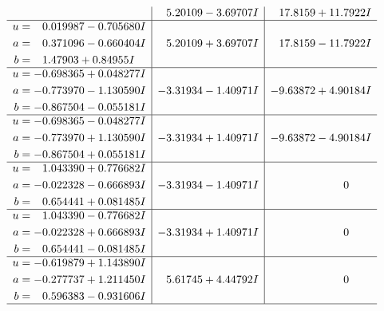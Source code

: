 \documentclass[1p]{elsarticle_modified}
\theoremstyle{definition}
\begin{document}
$$\begin{array}{c|c|c}
 & \phantom{-}5.20109 - 3.69707 I & \phantom{-}17.8159 + 11.7922 I \\ \hline\begin{aligned}
u &= \phantom{-}0.019987 - 0.705680 I \\
a &= \phantom{-}0.371096 - 0.660404 I \\
b &= \phantom{-}1.47903 + 0.84955 I\end{aligned}
 & \phantom{-}5.20109 + 3.69707 I & \phantom{-}17.8159 - 11.7922 I \\ \hline\begin{aligned}
u &= -0.698365 + 0.048277 I \\
a &= -0.773970 - 1.130590 I \\
b &= -0.867504 - 0.055181 I\end{aligned}
 & -3.31934 - 1.40971 I & -9.63872 + 4.90184 I \\ \hline\begin{aligned}
u &= -0.698365 - 0.048277 I \\
a &= -0.773970 + 1.130590 I \\
b &= -0.867504 + 0.055181 I\end{aligned}
 & -3.31934 + 1.40971 I & -9.63872 - 4.90184 I \\ \hline\begin{aligned}
u &= \phantom{-}1.043390 + 0.776682 I \\
a &= -0.022328 - 0.666893 I \\
b &= \phantom{-}0.654441 + 0.081485 I\end{aligned}
 & -3.31934 - 1.40971 I & \phantom{-0.000000 } 0 \\ \hline\begin{aligned}
u &= \phantom{-}1.043390 - 0.776682 I \\
a &= -0.022328 + 0.666893 I \\
b &= \phantom{-}0.654441 - 0.081485 I\end{aligned}
 & -3.31934 + 1.40971 I & \phantom{-0.000000 } 0 \\ \hline\begin{aligned}
u &= -0.619879 + 1.143890 I \\
a &= -0.277737 + 1.211450 I \\
b &= \phantom{-}0.596383 - 0.931606 I\end{aligned}
 & \phantom{-}5.61745 + 4.44792 I & \phantom{-0.000000 } 0\\
 \hline 
 \end{array}$$\newpage$$\begin{array}{c|c|c}  

\end{array}$$
\end{document}
